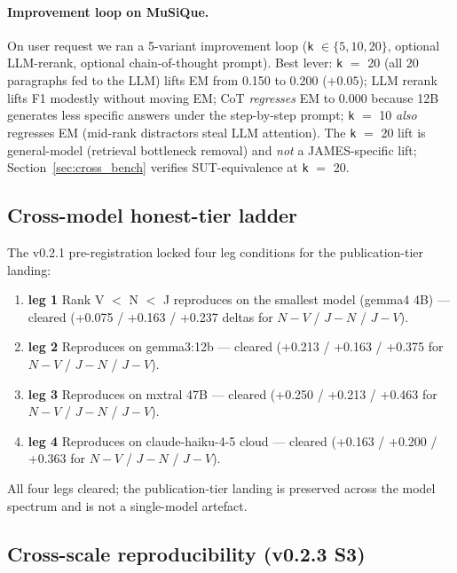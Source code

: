 \documentclass[11pt,a4paper]{article}
\begin{document}
\paragraph{Improvement loop on MuSiQue.} On user request we ran a 5-variant improvement loop (\texttt{k} $\in \{5, 10, 20\}$, optional LLM-rerank, optional chain-of-thought prompt). Best lever: \texttt{k} $=$ 20 (all 20 paragraphs fed to the LLM) lifts EM from 0.150 to 0.200 ($+0.05$); LLM rerank lifts F1 modestly without moving EM; CoT \emph{regresses} EM to 0.000 because 12B generates less specific answers under the step-by-step prompt; \texttt{k} $=$ 10 \emph{also} regresses EM (mid-rank distractors steal LLM attention). The \texttt{k} $=$ 20 lift is general-model (retrieval bottleneck removal) and \emph{not} a JAMES-specific lift; Section~\ref{sec:cross_bench} verifies SUT-equivalence at \texttt{k} $=$ 20.

\subsection{Cross-model honest-tier ladder}
\label{sec:cross_model_ladder}

The v0.2.1 pre-registration locked four leg conditions for the publication-tier landing:

\begin{enumerate}[leftmargin=*]
  \item \textbf{leg 1} Rank V $<$ N $<$ J reproduces on the smallest model (gemma4 4B) --- cleared (+0.075 / +0.163 / +0.237 deltas for $N{-}V$ / $J{-}N$ / $J{-}V$).
  \item \textbf{leg 2} Reproduces on gemma3:12b --- cleared (+0.213 / +0.163 / +0.375 for $N{-}V$ / $J{-}N$ / $J{-}V$).
  \item \textbf{leg 3} Reproduces on mxtral 47B --- cleared (+0.250 / +0.213 / +0.463 for $N{-}V$ / $J{-}N$ / $J{-}V$).
  \item \textbf{leg 4} Reproduces on claude-haiku-4-5 cloud --- cleared (+0.163 / +0.200 / +0.363 for $N{-}V$ / $J{-}N$ / $J{-}V$).
\end{enumerate}

All four legs cleared; the publication-tier landing is preserved across the model spectrum and is not a single-model artefact.

\subsection{Cross-scale reproducibility (v0.2.3 S3)}
\label{sec:cross_scale}
\end{document}
